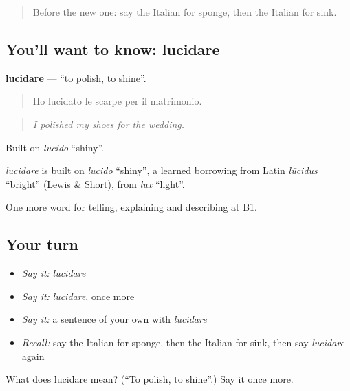 \label{lesson:IT-C534-lucidare}



\begin{quote}
Before the new one: say the Italian for sponge, then the Italian for sink.
\end{quote}

\subsection*{You'll want to know: lucidare}
\textbf{lucidare} — \textquotedblleft{}to polish, to shine\textquotedblright{}.

\begin{quote}
Ho lucidato le scarpe per il matrimonio.
\end{quote}

\begin{quote}
\emph{I polished my shoes for the wedding.}
\end{quote}

Built on \emph{lucido} \textquotedblleft{}shiny\textquotedblright{}.

\begin{cousinweb}
\emph{lucidare} is built on \emph{lucido} \textquotedblleft{}shiny\textquotedblright{}, a learned borrowing from Latin \emph{lūcidus} \textquotedblleft{}bright\textquotedblright{} (Lewis \& Short), from \emph{lūx} \textquotedblleft{}light\textquotedblright{}.
\end{cousinweb}

\begin{grammarlens}[title={What you've built}]
One more word for telling, explaining and describing at B1.
\end{grammarlens}

\subsection*{Your turn}
\begin{itemize}
\raggedright
  \item \emph{Say it:} \emph{lucidare}
  \item \emph{Say it:} \emph{lucidare}, once more
  \item \emph{Say it:} a sentence of your own with \emph{lucidare}
  \item \emph{Recall:} say the Italian for sponge, then the Italian for sink, then say \emph{lucidare} again
\end{itemize}

\begin{tcolorbox}[breakable,colback=teal!4,colframe=teal!35!black,title={Before you move on}]
What does lucidare mean? (\textquotedblleft{}To polish, to shine\textquotedblright{}.) Say it once more.
\end{tcolorbox}
